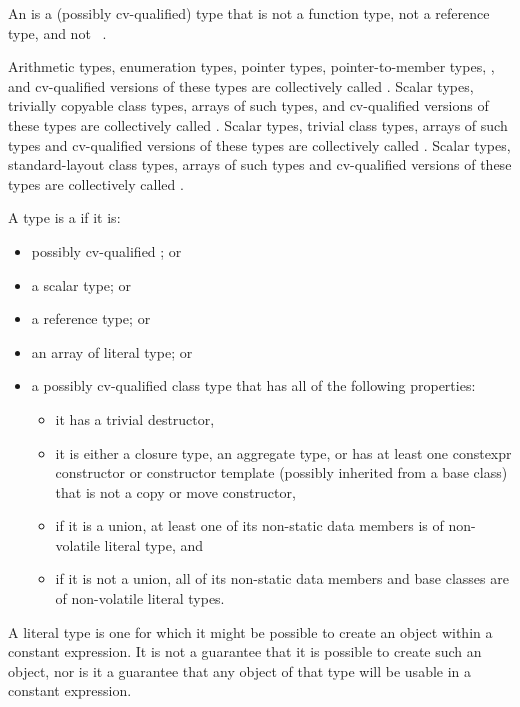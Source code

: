 \pnum
An  is a (possibly cv-qualified) type that is not
a function type, not a reference type, and not \cv{}~.

\pnum
{}%
%
%
Arithmetic types, enumeration types,
pointer types, pointer-to-member types,
,
and
cv-qualified versions of these
types are collectively called
.
Scalar types, trivially copyable class types,
arrays of such types, and cv-qualified versions of these
types are collectively called .
Scalar types, trivial class types,
arrays of such types and cv-qualified versions of these
types are collectively called
. Scalar types, standard-layout class
types, arrays of such types and
cv-qualified versions of these types
are collectively called .

\pnum
A type is a  if it is:
\begin{itemize}
\item possibly cv-qualified ; or
\item a scalar type; or
\item a reference type; or
\item an array of literal type; or
\item a possibly cv-qualified class type that
has all of the following properties:
\begin{itemize}
\item it has a trivial destructor,
\item it is either a closure type,
an aggregate type, or
has at least one constexpr constructor or constructor template
(possibly inherited from a base class)
that is not a copy or move constructor,
\item if it is a union, at least one of its non-static data members is
of non-volatile literal type, and
\item if it is not a union, all of its non-static data members and base classes are
of non-volatile literal types.
\end{itemize}
\end{itemize}
\begin{note}
A literal type is one for which
it might be possible to create an object
within a constant expression.
It is not a guarantee that it is possible to create such an object,
nor is it a guarantee that any object of that type
will be usable in a constant expression.
\end{note}

